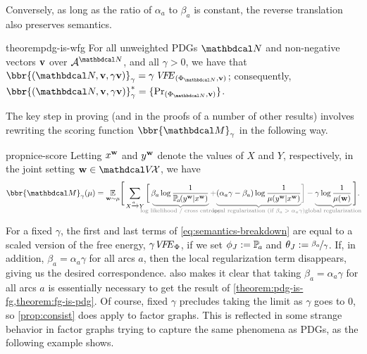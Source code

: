 Conversely, as long as the ratio of $\alpha_a$ to $\beta_a$ is constant, the
reverse translation also preserves semantics.
\begin{linked}{theorem}{pdg-is-wfg}
For all unweighted PDGs $\dg{N}$ and non-negative vectors $\mathbf v$
over $\Ar^{\dg N}$, and all $\gamma > 0$, we have that 
$\bbr{(\dg N, \mat v, \gamma \mat v)}_{\gamma}
= \gamma\,\VFE_{(\Phi_{\dg N}, \mat v)} $; consequently,
$\bbr{(\dg N,  \mat v,  \gamma\mat v)}_{\gamma}^*
		= \{\Pr_{(\Phi_{\dg N}, \mat v)} \}$. 
\end{linked}







The key step in proving 
(and in the proofs of a number of other results) involves 
rewriting  
the scoring function $\bbr{\dg M}_\gamma$ in the following way.

\begin{linked}{prop}{nice-score}%
 Letting $x^{\mathbf w}$ and $y^{\mathbf w}$ denote the values of
  $X$ and $Y$, respectively, in
  the joint setting $\mat w \in \V\!\X$, 
we have 
\begin{equation}\label{eq:semantics-breakdown}
\begin{split}
\bbr{\dg M}_\gamma(\mu) =  \Ex_{\mat w \sim \mu}\!
\Bigg[
 \sum_{ X \xrightarrow{\!\!a} Y  }
\bigg[\,
    \color{gray}
    \underbrace{\color{black}
      \!\beta_a \log \frac{1}{\p_a(y^{\mat w} |x^{\mat w})}
	}_{\color{gray}\smash{\mathclap{\text{log likelihood / cross entropy}}}} +
    {\color{gray}\underbrace{\color{black} 
({\alpha_a}\gamma - \beta_a ) \log \frac{1}{\mu(y^{\mat w} |x^{\mat w})} 
	}_{\color{gray}\smash{\mathclap{\text{local regularization (if $\beta_a > 
	\alpha_a
	\gamma$)}}}}}\bigg] - \underbrace{\color{black}
\gamma \log \frac{1}{\mu(\mat w)}
	}_{\color{gray}\smash{\mathclap{\text{global
        regularization}}}}\color{black} \Bigg].
\end{split}
\end{equation}
\end{linked}
For a fixed $\gamma$, the first and last terms
of \eqref{eq:semantics-breakdown} are equal to a scaled
version of the free energy, $\gamma\mathit{V\mkern-4mu F\mkern-4.5mu E}_\Phi$, 
if we set $\phi_J := \p_a$ and $\theta_J := \nicefrac{\beta_a}{\gamma}$.  
If, in addition, $\beta_a = {\alpha_a}\gamma$ for all
arcs $a$, then
the local regularization term disappears, giving us
the desired correspondence. 
%
%
 also makes it clear that 
taking $\beta_a = {\alpha_a} \gamma$ for all arcs $a$ is
essentially necessary to get the result of \cref{theorem:pdg-is-fg,theorem:fg-is-pdg}.
Of course, fixed $\gamma$ precludes 
    taking the limit as $\gamma$ goes to 0, so 
    \cref{prop:consist} does apply to factor graphs. 
This is reflected in some strange
behavior in factor graphs trying to capture the same phenomena as
PDGs, as the following example shows.

